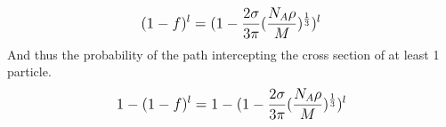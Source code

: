 \documentclass[12pt]{article}
\begin{document}
\begin{equation}\label{eqn:isParticleInBox}
\begin{split}
\mathlarger{
(1-f)^l = (1-\frac{2\sigma}{3\pi}(\frac{N_A\rho}{M})^{\frac{1}{3}})^l
}\\
\end{split}
\end{equation}
And thus the probability of the path intercepting the cross section of at least 1 particle.
\begin{equation}\label{eqn:isParticleInBox}
\begin{split}
\mathlarger{
1-(1-f)^l = 1-(1-\frac{2\sigma}{3\pi}(\frac{N_A\rho}{M})^{\frac{1}{3}})^l
}\\
\end{split}
\end{equation}
\end{document}
